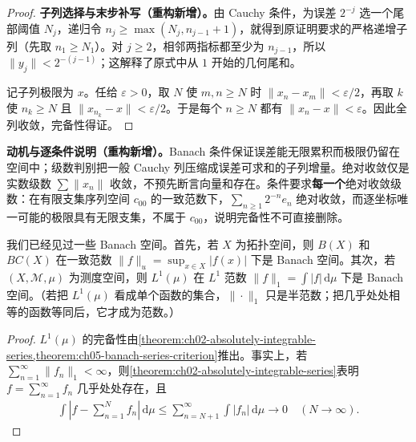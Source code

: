 \documentclass[../../main.tex]{subfiles}
\begin{document}
\begin{proof}
\textbf{子列选择与末步补写（重构新增）。}由 Cauchy 条件，为误差 $2^{-j}$ 选一个尾部阈值 $N_j$，递归令 $n_j\ge\max(N_j,n_{j-1}+1)$，就得到原证明要求的严格递增子列（先取 $n_1\ge N_1$）。对 $j\ge2$，相邻两指标都至少为 $n_{j-1}$，所以 $\|y_j\|<2^{-(j-1)}$；这解释了原式中从 $1$ 开始的几何尾和。

记子列极限为 $x$。任给 $\varepsilon>0$，取 $N$ 使 $m,n\ge N$ 时 $\|x_n-x_m\|<\varepsilon/2$，再取 $k$ 使 $n_k\ge N$ 且 $\|x_{n_k}-x\|<\varepsilon/2$。于是每个 $n\ge N$ 都有 $\|x_n-x\|<\varepsilon$。因此全列收敛，完备性得证。
\end{proof}
\begin{remark}
\textbf{动机与逐条件说明（重构新增）。}Banach 条件保证误差能无限累积而极限仍留在空间中；级数判别把一般 Cauchy 列压缩成误差可求和的子列增量。绝对收敛仅是实数级数 $\sum\|x_n\|$ 收敛，不预先断言向量和存在。条件要求\textbf{每一个}绝对收敛级数：在有限支集序列空间 $c_{00}$ 的一致范数下，$\sum_{n\ge1}2^{-n}e_n$ 绝对收敛，而逐坐标唯一可能的极限具有无限支集，不属于 $c_{00}$，说明完备性不可直接删除。
\end{remark}
\begin{example}\label{example:ch05-banach-function-spaces}
我们已经见过一些 Banach 空间。首先，若 $X$ 为拓扑空间，则 $B(X)$ 和 $BC(X)$ 在一致范数 $\|f\|_u=\sup_{x\in X}|f(x)|$ 下是 Banach 空间。其次，若 $(X,\mathscr M,\mu)$ 为测度空间，则 $L^1(\mu)$ 在 $L^1$ 范数 $\|f\|_1=\int|f|\,\mathrm d\mu$ 下是 Banach 空间。（若把 $L^1(\mu)$ 看成单个函数的集合，$\|\cdot\|_1$ 只是半范数；把几乎处处相等的函数等同后，它才成为范数。）
\end{example}
\begin{proof}
$L^1(\mu)$ 的完备性由\cref{theorem:ch02-absolutely-integrable-series,theorem:ch05-banach-series-criterion}推出。事实上，若 $\sum_{n=1}^{\infty}\|f_n\|_1<\infty$，则\cref{theorem:ch02-absolutely-integrable-series}表明 $f=\sum_{n=1}^{\infty}f_n$ 几乎处处存在，且
\begin{align*}
\int\left|f-\sum_{n=1}^Nf_n\right|\,\mathrm d\mu
\le\sum_{n=N+1}^{\infty}\int|f_n|\,\mathrm d\mu\longrightarrow0\quad(N\to\infty).
\end{align*}
\end{proof}
\end{document}
